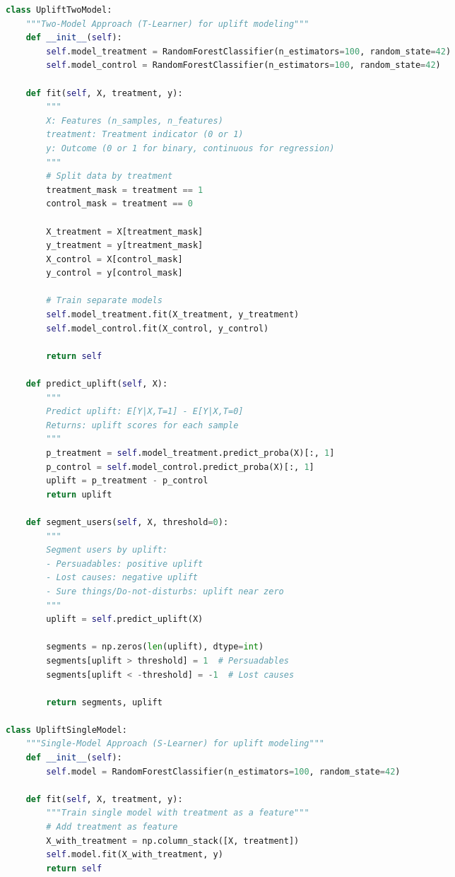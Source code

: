 \documentclass[8pt,landscape]{article}
\begin{document}
\begin{multicols}{3}
\begin{lstlisting}[language=Python]
class UpliftTwoModel:
    """Two-Model Approach (T-Learner) for uplift modeling"""
    def __init__(self):
        self.model_treatment = RandomForestClassifier(n_estimators=100, random_state=42)
        self.model_control = RandomForestClassifier(n_estimators=100, random_state=42)

    def fit(self, X, treatment, y):
        """
        X: Features (n_samples, n_features)
        treatment: Treatment indicator (0 or 1)
        y: Outcome (0 or 1 for binary, continuous for regression)
        """
        # Split data by treatment
        treatment_mask = treatment == 1
        control_mask = treatment == 0

        X_treatment = X[treatment_mask]
        y_treatment = y[treatment_mask]
        X_control = X[control_mask]
        y_control = y[control_mask]

        # Train separate models
        self.model_treatment.fit(X_treatment, y_treatment)
        self.model_control.fit(X_control, y_control)

        return self

    def predict_uplift(self, X):
        """
        Predict uplift: E[Y|X,T=1] - E[Y|X,T=0]
        Returns: uplift scores for each sample
        """
        p_treatment = self.model_treatment.predict_proba(X)[:, 1]
        p_control = self.model_control.predict_proba(X)[:, 1]
        uplift = p_treatment - p_control
        return uplift

    def segment_users(self, X, threshold=0):
        """
        Segment users by uplift:
        - Persuadables: positive uplift
        - Lost causes: negative uplift
        - Sure things/Do-not-disturbs: uplift near zero
        """
        uplift = self.predict_uplift(X)

        segments = np.zeros(len(uplift), dtype=int)
        segments[uplift > threshold] = 1  # Persuadables
        segments[uplift < -threshold] = -1  # Lost causes

        return segments, uplift

class UpliftSingleModel:
    """Single-Model Approach (S-Learner) for uplift modeling"""
    def __init__(self):
        self.model = RandomForestClassifier(n_estimators=100, random_state=42)

    def fit(self, X, treatment, y):
        """Train single model with treatment as a feature"""
        # Add treatment as feature
        X_with_treatment = np.column_stack([X, treatment])
        self.model.fit(X_with_treatment, y)
        return self


\end{lstlisting}
\end{multicols}
\end{document}
